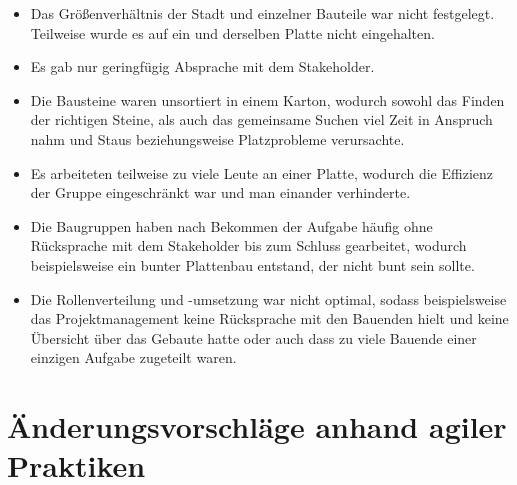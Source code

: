 \documentclass[a4paper, 11pt]{article}
\begin{document}
\begin{itemize}
    \item Das Größenverhältnis der Stadt und einzelner Bauteile war nicht festgelegt. Teilweise wurde es auf ein und derselben Platte nicht eingehalten.
    \item Es gab nur geringfügig Absprache mit dem Stakeholder.
    \item Die Bausteine waren unsortiert in einem Karton, wodurch sowohl das Finden der richtigen Steine, als auch das gemeinsame Suchen viel Zeit in Anspruch nahm und Staus beziehungsweise Platzprobleme verursachte.
    \item Es arbeiteten teilweise zu viele Leute an einer Platte, wodurch die Effizienz der Gruppe eingeschränkt war und man einander verhinderte.
    \item Die Baugruppen haben nach Bekommen der Aufgabe häufig ohne Rücksprache mit dem Stakeholder bis zum Schluss gearbeitet, wodurch beispielsweise ein bunter Plattenbau entstand, der nicht bunt sein sollte.
    \item Die Rollenverteilung und -umsetzung war nicht optimal, sodass beispielsweise das Projektmanagement keine Rücksprache mit den Bauenden hielt und keine Übersicht über das Gebaute hatte oder auch dass zu viele Bauende einer einzigen Aufgabe zugeteilt waren.
\end{itemize}
\pagebreak
	
\section{Änderungsvorschläge anhand agiler Praktiken}
\end{document}
